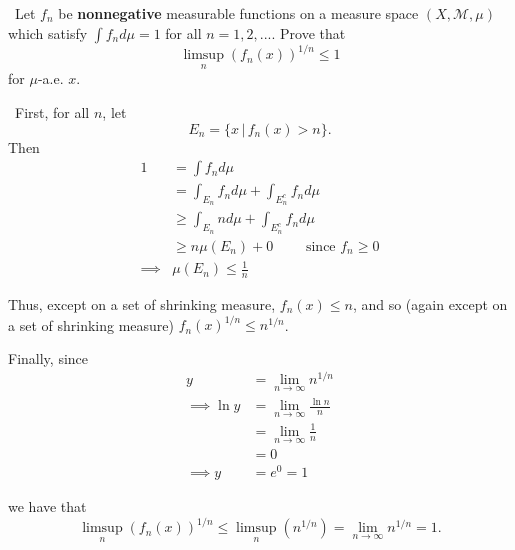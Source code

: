 \documentclass[12pt]{Qual}
\begin{document}
\begin{problem} $\,$
Let $f_n$ be \textbf{nonnegative} measurable functions on a measure space $(X,\mathscr{M},\mu)$ which satisfy $\int f_nd\mu=1$ for all $n=1,2,... .$ Prove that $$\limsup_n(f_n(x))^{1/n}\le1$$ for $\mu$-a.e. $x.$
\end{problem}


\begin{solution}$\,$
First, for all $n$, let $$E_n=\{x\,|\,f_n(x)>n\}.$$ Then \begin{align*}
    1&=\int f_nd\mu\\
    &=\int_{E_n}f_nd\mu+\int_{E_n^c}f_nd\mu\\
    &\ge\int_{E_n}nd\mu+\int_{E_n^c}f_nd\mu\\
    &\ge n\mu(E_n)+0\qquad\text{ since }f_n\ge0\\
    \implies&\mu(E_n)\le\frac{1}{n}
\end{align*}

Thus, except on a set of shrinking measure, $f_n(x)\le n$, and so (again except on a set of shrinking measure) $f_n(x)^{1/n}\le n^{1/n}$.

Finally, since \begin{align*}
    y&=\lim_{n\to\infty}n^{1/n}\\
   \implies \ln y&=\lim_{n\to\infty}\frac{\ln n}{n}\\
    &=\lim_{n\to\infty}\frac{1}{n}\\
    &=0\\
    \implies y&=e^0=1
\end{align*}

we have that $$\limsup_n(f_n(x))^{1/n}\le\limsup_n(n^{1/n})=\lim_{n\to\infty}n^{1/n}=1.$$

\begin{comment}
Let $$g_n=\sup_{k\ge n}(f_k(x))^{1/k}<\infty$$ a.e. since if $f_k(x)$ grows arbitrarily large, this growth must occur on sets of increasingly small measure (since $f_k$ are integrable).  Then, by definition of $\sup$, for all $\varepsilon>0$, there exists some $f_k(x)^{1/k}$ such that $$f_k(x)^{1/k}\ge g_n(x)-\frac{1}{n}.$$

Let $\varepsilon=\frac{1}{n}$ and call $f_{k_n}(x)^{1/k_n}$ the function satisfying the above.

Now, $$\inf_{n}f_{k_n}(x)^{1/k_n}\ge\inf_n\left(g_n(x)-\frac{1}{n}\right)$$
\end{comment}

\end{solution}
\newpage
\end{document}
